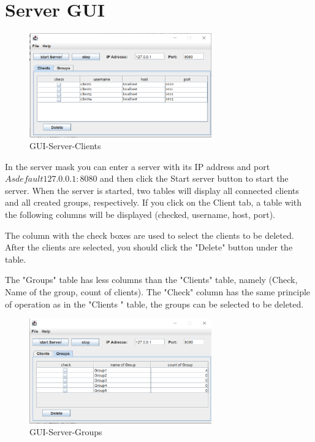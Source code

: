 \section{Server GUI}\label{sec:server-gui}
\begin{figure}[htb!]
    \centering
    \includegraphics[width=0.7\textwidth]{gfx/GUI_Server_Clients}
    \caption{GUI-Server-Clients}
    \label{fig:gui-server-clients}
\end{figure}
In the server mask you can enter a server with its IP address and port \(As default 127.0.0.1:8080\)
and then click the Start server button to start the server.
When the server is started, two tables will display all connected clients and all created groups,
respectively.
If you click on the Client tab, a table with the following columns will be displayed (checked,
username, host, port).
\medskip

\noindent
The column with the check boxes are used to select the clients to be deleted.
After the clients are selected, you should click the "Delete" button under the table.
\medskip

\noindent
The "Groups" table has less columns than the "Clients" table, namely (Check, Name of the group,
count of clients).
The "Check" column has the same principle of operation as in the "Clients " table, the groups
can be selected to be deleted.

\begin{figure}[htb!]
    \centering
    \includegraphics[width=0.7\textwidth]{gfx/GUI_Server_Groups}
    \caption{GUI-Server-Groups}
    \label{fig:gui-server-groups}
\end{figure}

